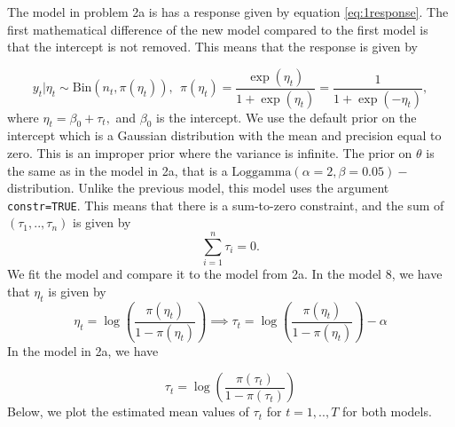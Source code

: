 \documentclass[
]{article}
\newenvironment{Shaded}{\begin{snugshade}}{\end{snugshade}}
\newcommand{\AttributeTok}[1]{\textcolor[rgb]{0.77,0.63,0.00}{#1}}
\newcommand{\DecValTok}[1]{\textcolor[rgb]{0.00,0.00,0.81}{#1}}
\newcommand{\FunctionTok}[1]{\textcolor[rgb]{0.00,0.00,0.00}{#1}}
\newcommand{\NormalTok}[1]{#1}
\newcommand{\OtherTok}[1]{\textcolor[rgb]{0.56,0.35,0.01}{#1}}
\newcommand{\SpecialCharTok}[1]{\textcolor[rgb]{0.00,0.00,0.00}{#1}}
\newcommand{\StringTok}[1]{\textcolor[rgb]{0.31,0.60,0.02}{#1}}
\begin{document}
The model in problem 2a is has a response given by equation \eqref{eq:1response}.
The first mathematical difference of the new model compared to the first model is that the intercept is not removed. This means that the response is given by

\[
y_t | \eta_t \sim \text{Bin}(n_t, \pi(\eta_t)), \ \ \pi(\eta_t)=\frac{\exp(\eta_t)}{1+\exp(\eta_t)}=\frac{1}{1+\exp(-\eta_t)},
\]
where \(\eta_t=\beta_0+\tau_t,\) and \(\beta_0\) is the intercept. We use the default prior on the intercept which is a Gaussian distribution with the mean and precision equal to zero. This is an improper prior where the variance is infinite. The prior on \(\theta\) is the same as in the model in 2a, that is a \(\text{Loggamma}(\alpha=2, \beta=0.05)-\) distribution.
Unlike the previous model, this model uses the argument \texttt{constr=TRUE}.
This means that there is a sum-to-zero constraint, and the sum of \((\tau_1,..,\tau_n)\) is given by
\[
\sum_{i=1}^{n} \tau_i=0.
\]
We fit the model and compare it to the model from 2a. In the model 8, we have that \(\eta_t\) is given by
\[
\eta_t=\log \left (\frac{\pi (\eta_t)}{1- \pi (\eta_t)} \right) \implies \tau_t=\log \left (\frac{\pi (\eta_t)}{1- \pi (\eta_t)} \right)-\alpha
\]
In the model in 2a, we have

\[
\tau_t=\log \left (\frac{\pi (\tau_t)}{1- \pi (\tau_t)} \right) 
\]
Below, we plot the estimated mean values of \(\tau_t\) for \(t=1,..,T\) for both models.

\begin{Shaded}
\end{Shaded}
\end{document}
